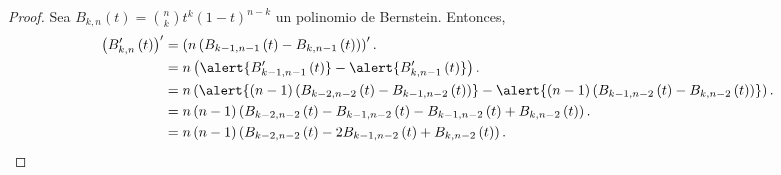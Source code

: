 \begin{frame}
    \begin{proof}
        Sea
        \begin{math}
            B_{k,n}\left(t\right)=
            \binom{n}{k}
            t^{k}
            \left(1-t\right)^{n-k}
        \end{math}
        un polinomio de Bernstein.
        Entonces,
        \begin{align*}
            {\left(
                B^{\prime}_{k,n}\left(t\right)
                \right)}^{\prime}
             & =
            \left(
            n
            \left(
            B_{k-1,n-1}\left(t\right)-
            B_{k,n-1}\left(t\right)
            \right)
            \right)^{\prime}. \\
             & =
            n\left(
            \alert{
                B^{\prime}_{k-1,n-1}\left(t\right)
            }    -
            \alert{
                B^{\prime}_{k,n-1}\left(t\right)
            }
            \right).          \\
             & =
            n\left(
            \alert{
                \left(n-1\right)
                \left(
                B_{k-2,n-2}\left(t\right)-
                B_{k-1,n-2}\left(t\right)
                \right)
            }    -
            \alert{
                \left(n-1\right)
                \left(
                B_{k-1,n-2}\left(t\right)-
                B_{k,n-2}\left(t\right)
                \right)
            }
            \right).          \\
             & =
            n\left(n-1\right)
            \left(
            B_{k-2,n-2}\left(t\right)-
            B_{k-1,n-2}\left(t\right)-
            B_{k-1,n-2}\left(t\right)+
            B_{k,n-2}\left(t\right)
            \right).          \\
             & =
            n\left(n-1\right)
            \left(
            B_{k-2,n-2}\left(t\right)-
            2B_{k-1,n-2}\left(t\right)+
            B_{k,n-2}\left(t\right)
            \right).
        \end{align*}
    \end{proof}
\end{frame}